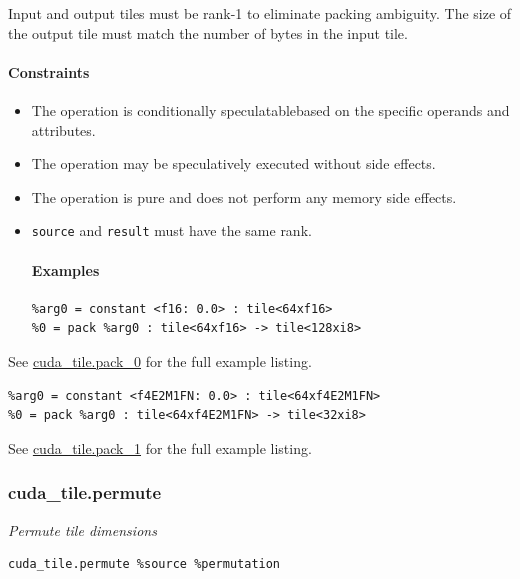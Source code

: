 \documentclass{article}
\begin{document}
Input and output tiles must be rank-1 to eliminate packing ambiguity. The size of the output tile must match the number of bytes in the input tile.



\paragraph{Constraints}

\begin{itemize}
\item The operation is conditionally speculatablebased on the specific operands and attributes.
\item The operation may be speculatively executed without side effects.
\item The operation is pure and does not perform any memory side effects.
\item \texttt{source} and \texttt{result} must have the same rank.


\paragraph{Examples}

\begin{lstlisting}
%arg0 = constant <f16: 0.0> : tile<64xf16>
%0 = pack %arg0 : tile<64xf16> -> tile<128xi8>
\end{lstlisting}

\end{itemize}
See \href{https://docs.nvidia.com/cuda/tile-ir/latest/sections/appendix.html#example-cuda-tile-pack-0}{cuda\_tile.pack\_0} for the full example listing.


\begin{lstlisting}
%arg0 = constant <f4E2M1FN: 0.0> : tile<64xf4E2M1FN>
%0 = pack %arg0 : tile<64xf4E2M1FN> -> tile<32xi8>
\end{lstlisting}

See \href{https://docs.nvidia.com/cuda/tile-ir/latest/sections/appendix.html#example-cuda-tile-pack-1}{cuda\_tile.pack\_1} for the full example listing.



\subsubsection{cuda\_tile.permute}

\textit{Permute tile dimensions}


\begin{lstlisting}
cuda_tile.permute %source %permutation
\end{lstlisting}
\end{document}
